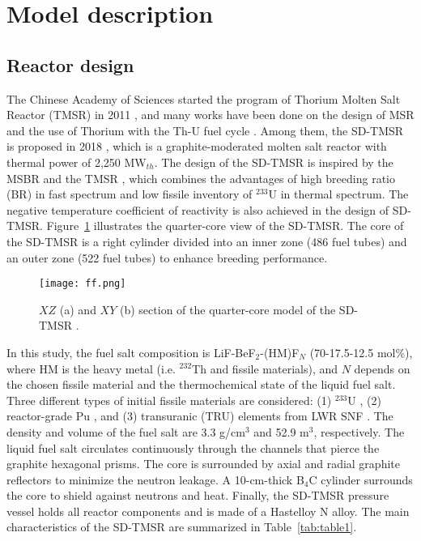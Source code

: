\section{Model description} \label{Model-description}
\subsection{Reactor design}

The Chinese Academy of Sciences started the program of Thorium Molten Salt Reactor (TMSR) in 2011 \cite{jiang2012advanced}, and many works have been done on the design of MSR and the use of Thorium with the Th-U fuel cycle \cite{li_optimization_2018,li2015analysis}. Among them, the SD-TMSR is proposed in 2018 \cite{li_optimization_2018}, which is a graphite-moderated molten salt reactor with thermal power of 2,250 MW$_{th}$. The design of the SD-TMSR is inspired by the \gls{MSBR} \cite{robertson_conceptual_1971} and the \gls{TMSR} \cite{nuttin2005potential}, which combines the advantages of high breeding ratio (BR) in fast spectrum and low fissile inventory of $^{233}$U in thermal spectrum. The negative temperature coefficient of reactivity is also achieved in the design of SD-TMSR. Figure~\ref{fig:ff} illustrates the quarter-core view of the 
SD-TMSR. The core of the 
SD-TMSR is a right cylinder divided into an inner zone (486 fuel tubes) 
and an outer zone (522 fuel tubes) to enhance breeding performance.
\begin{figure} %
	\texttt{[image: ff.png]}
	\caption{$XZ$ (a) and $XY$ (b) section of the quarter-core model of the 
		SD-TMSR \cite{ashraf2019Preliminary}.}
	\label{fig:ff}
\end{figure}
In this study, the fuel salt composition is LiF-BeF$_2$-(HM)F$_N$ (70-17.5-12.5 mol\%),
where HM is the heavy metal (i.e. $^{232}$Th and fissile 
materials), and $N$ depends on the chosen fissile material and the 
thermochemical state of the liquid fuel salt. Three different types of initial 
fissile materials are considered: (1) $^{233}$U \cite{ashraf2020whole}, 
(2) reactor-grade Pu \cite{marka1993explosive}, and (3) transuranic (TRU) 
elements from \gls{LWR} \gls{SNF} \cite{de2000scenarios}.
The density and volume of the fuel salt are 3.3 g/cm$^{3}$ and 52.9 m$^3$, 
respectively. The liquid fuel salt circulates continuously through the channels
that pierce the graphite hexagonal prisms. The core is surrounded by 
axial and radial graphite reflectors to minimize the neutron leakage.
A 10-cm-thick B$_4$C cylinder surrounds the core to shield against neutrons and heat.
Finally, the SD-TMSR pressure vessel holds all reactor components and is made of 
a Hastelloy N alloy. The main characteristics of the SD-TMSR are 
summarized in Table~\ref{tab:table1}.


